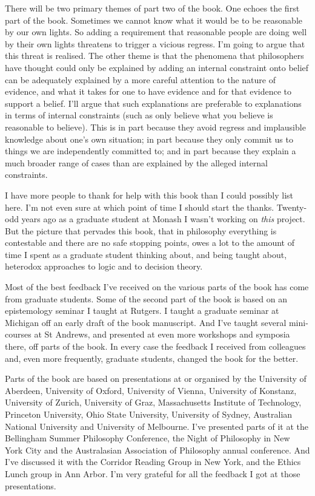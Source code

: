 There will be two primary themes of part two of the book. One echoes the first part of the book. Sometimes we cannot know what it would be to be reasonable by our own lights. So adding a requirement that reasonable people are doing well by their own lights threatens to trigger a vicious regress. I'm going to argue that this threat is realised. The other theme is that the phenomena that philosophers have thought could only be explained by adding an internal constraint onto belief can be adequately explained by a more careful attention to the nature of evidence, and what it takes for one to have evidence and for that evidence to support a belief. I'll argue that such explanations are preferable to explanations in terms of internal constraints (such as only believe what you believe is reasonable to believe). This is in part because they avoid regress and implausible knowledge about one's own situation; in part because they only commit us to things we are independently committed to; and in part because they explain a much broader range of cases than are explained by the alleged internal constraints.

I have more people to thank for help with this book than I could possibly list here. I'm not even sure at which point of time I should start the thanks. Twenty-odd years ago as a graduate student at Monash I wasn't working on \emph{this} project. But the picture that pervades this book, that in philosophy everything is contestable and there are no safe stopping points, owes a lot to the amount of time I spent as a graduate student thinking about, and being taught about, heterodox approaches to logic and to decision theory.

Most of the best feedback I've received on the various parts of the book has come from graduate students. Some of the second part of the book is based on an epistemology seminar I taught at Rutgers. I taught a graduate seminar at Michigan off an early draft of the book manuscript. And I've taught several mini-courses at St Andrews, and presented at even more workshops and symposia there, off parts of the book. In every case the feedback I received from colleagues and, even more frequently, graduate students, changed the book for the better.

Parts of the book are based on presentations at or organised by the University of Aberdeen, University of Oxford, University of Vienna, University of Konstanz, University of Zurich, University of Graz, Massachusetts Institute of Technology, Princeton University, Ohio State University, University of Sydney, Australian National University and University of Melbourne. I've presented parts of it at the Bellingham Summer Philosophy Conference, the Night of Philosophy in New York City and the Australasian Association of Philosophy annual conference. And I've discussed it with the Corridor Reading Group in New York, and the Ethics Lunch group in Ann Arbor. I'm very grateful for all the feedback I got at those presentations.

